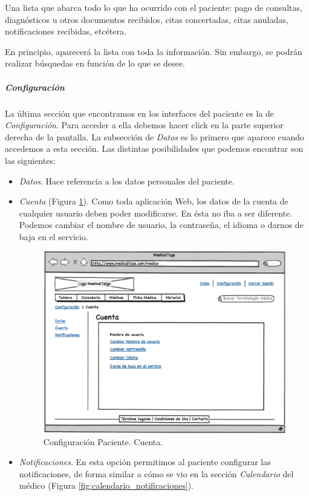 \documentclass[a4paper,oneside,11pt]{book}
\begin{document}
		Una lista que abarca todo lo que ha ocurrido con el paciente: pago de consultas, diagnósticos u otros documentos recibidos, citas concertadas, citas anuladas, notificaciones recibidas, etcétera. 
		
		En principio, aparecerá la lista con toda la información. Sin embargo, se podrán realizar búsquedas en función de lo que se desee.		
		
		
		\subparagraph{Configuración} %
		\label{par:paciente_configuracion}
		
			La última sección que encontramos en los interfaces del paciente es la de \textit{Configuración}. Para acceder a ella debemos hacer click en la parte superior derecha de la pantalla. La subsección de \textit{Datos} es lo primero que aparece cuando accedemos a esta sección. Las distintas posibilidades que podemos encontrar son las siguientes:

			\begin{itemize}
				\item \textit{Datos}. Hace referencia a los datos personales del paciente. 
				\item \textit{Cuenta} (Figura \ref{fig:configuracion_cuenta_paciente}). Como toda aplicación Web, los datos de la cuenta de cualquier usuario deben poder modificarse. En ésta no iba a ser diferente. Podemos cambiar el nombre de usuario, la contraseña, el idioma o darnos de baja en el servicio.

				\begin{figure}[H]
				  \centering
				    \includegraphics[width=12cm]{img/eps/28_1_Cuenta_Pacientes.eps}
				  \caption{Configuración Paciente. Cuenta.}
				  \label{fig:configuracion_cuenta_paciente}
				\end{figure}

				\item \textit{Notificaciones}. En esta opción permitimos al paciente configurar las notificaciones, de forma similar a cómo se vio en la sección \textit{Calendario} del médico (Figura \ref{fig:calendario_notificaciones}). 
			\end{itemize}
		
\end{document}
